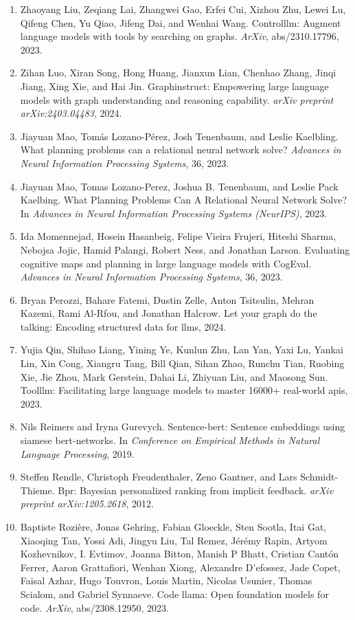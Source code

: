 \documentclass[11pt,UTF8,fontset=fandol]{ctexart}
\begin{document}
\begin{enumerate}[leftmargin=2em]
\item Zhaoyang Liu, Zeqiang Lai, Zhangwei Gao, Erfei Cui, Xizhou Zhu, Lewei Lu, Qifeng Chen, Yu Qiao, Jifeng Dai, and Wenhai Wang. Controlllm: Augment language models with tools by searching on graphs. \textit{ArXiv}, abs/2310.17796, 2023.
\item Zihan Luo, Xiran Song, Hong Huang, Jianxun Lian, Chenhao Zhang, Jinqi Jiang, Xing Xie, and Hai Jin. Graphinstruct: Empowering large language models with graph understanding and reasoning capability. \textit{arXiv preprint arXiv:2403.04483}, 2024.
\item Jiayuan Mao, Tom\'as Lozano-P\'erez, Josh Tenenbaum, and Leslie Kaelbling. What planning problems can a relational neural network solve? \textit{Advances in Neural Information Processing Systems}, 36, 2023.
\item Jiayuan Mao, Tomas Lozano-Perez, Joshua B. Tenenbaum, and Leslie Pack Kaelbing. What Planning Problems Can A Relational Neural Network Solve? In \textit{Advances in Neural Information Processing Systems (NeurIPS)}, 2023.
\item Ida Momennejad, Hosein Hasanbeig, Felipe Vieira Frujeri, Hiteshi Sharma, Nebojsa Jojic, Hamid Palangi, Robert Ness, and Jonathan Larson. Evaluating cognitive maps and planning in large language models with CogEval. \textit{Advances in Neural Information Processing Systems}, 36, 2023.
\item Bryan Perozzi, Bahare Fatemi, Dustin Zelle, Anton Tsitsulin, Mehran Kazemi, Rami Al-Rfou, and Jonathan Halcrow. Let your graph do the talking: Encoding structured data for llms, 2024.
\item Yujia Qin, Shihao Liang, Yining Ye, Kunlun Zhu, Lan Yan, Yaxi Lu, Yankai Lin, Xin Cong, Xiangru Tang, Bill Qian, Sihan Zhao, Runchu Tian, Ruobing Xie, Jie Zhou, Mark Gerstein, Dahai Li, Zhiyuan Liu, and Maosong Sun. Toolllm: Facilitating large language models to master 16000+ real-world apis, 2023.
\item Nils Reimers and Iryna Gurevych. Sentence-bert: Sentence embeddings using siamese bert-networks. In \textit{Conference on Empirical Methods in Natural Language Processing}, 2019.
\item Steffen Rendle, Christoph Freudenthaler, Zeno Gantner, and Lars Schmidt-Thieme. Bpr: Bayesian personalized ranking from implicit feedback. \textit{arXiv preprint arXiv:1205.2618}, 2012.
\item Baptiste Rozi\`ere, Jonas Gehring, Fabian Gloeckle, Sten Sootla, Itai Gat, Xiaoqing Tan, Yossi Adi, Jingyu Liu, Tal Remez, J\'er\'emy Rapin, Artyom Kozhevnikov, I. Evtimov, Joanna Bitton, Manish P Bhatt, Cristian Cant\'on Ferrer, Aaron Grattafiori, Wenhan Xiong, Alexandre D'efossez, Jade Copet, Faisal Azhar, Hugo Touvron, Louis Martin, Nicolas Usunier, Thomas Scialom, and Gabriel Synnaeve. Code llama: Open foundation models for code. \textit{ArXiv}, abs/2308.12950, 2023.

\end{enumerate}
\end{document}
